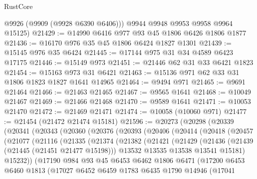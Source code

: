 \begin{lexlean}{RustCore}
\begin{coremodule}
        @9926
        (@9909 (@9928 @6390 @6406)))
      @9944
      @9948
      @9953
      @9958
      @9964
      @15125)
@21429 := @14990 @6416 @977 @93 @45 @1806 @6426 @1806 @1877
@21436 := @16170 @976 @35 @45 @1806 @6424 @1827 @1301
@21439 := @15145 @976 @35 @6424
@21445 := @17144 @975 @31 @34 @4589 @6423 @17175
@21446 := @15149 @973
@21451 := @21446 @62 @31 @33 @6421 @1823
@21454 := @15163 @973 @31 @6421
@21463 := @15136 @971 @62 @33 @31 @1806 @1823 @1827 @1641 @14965
@21464 := @9494 @971
@21465 := @9691 @21464
@21466 := @21463 @21465
@21467 := @9565 @1641
@21468 := @10049 @21467
@21469 := @21466 @21468
@21470 := @9589 @1641
@21471 := @10053 @21470
@21472 := @21469 @21471
@21474 := @10058 (@10060 @971)
@21477 := @21454 (@21472 @21474 @15181)
@21596 := @20273
    (@20298
      (@20339
        (@20341
          (@20343
            (@20360
              (@20376
                (@20393
                  (@20406
                    (@20414
                      (@20418
                        (@20457
                          (@21077
                            (@21116
                              (@21335
                                (@21374
                                  (@21382
                                    (@21421
                                      (@21429
                                        (@21436
                                          (@21439 (@21445 (@21451 @21477 @15198)))
                                          @13532
                                          @13535
                                          @13538
                                          @13541
                                          @15181)
                                        @15232))
                                    (@17190
                                      @984
                                      @93
                                      @45
                                      @6453
                                      @6462
                                      @1806
                                      @6471
                                      (@17200
                                        @6453
                                        @6460
                                        @1813
                                        (@17027
                                          @6452
                                          @6459
                                          @1783
                                          @6435
                                          @1790
                                          @14946
                                          (@17041

\end{coremodule}
\end{lexlean}
